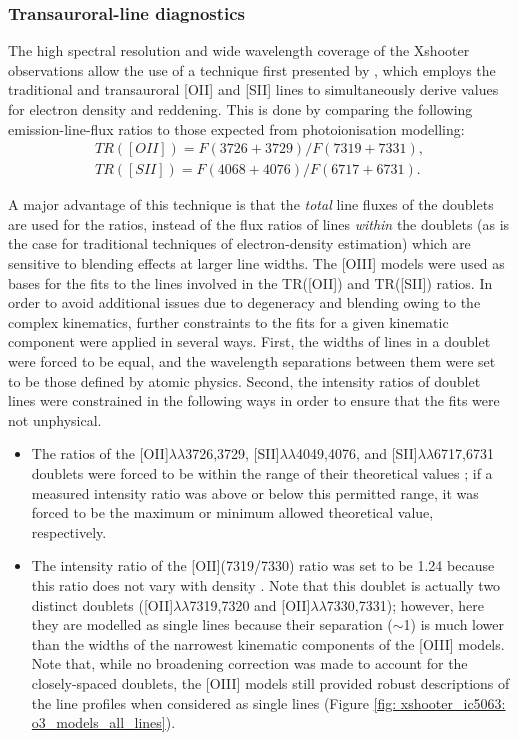 \subsubsection{Transauroral-line diagnostics}
\label{section: xshooter_ic5063: properties_of_outflowing_gas: uvb_vis_analysis_and_results: transauroral_lines}

The high spectral resolution and wide wavelength coverage of the Xshooter observations allow the use of a technique first presented by \citet{Holt2011}, which employs the traditional and transauroral [OII] and [SII] lines to simultaneously derive values for electron density and reddening. This is done by comparing the following emission-line-flux ratios to those expected from photoionisation modelling:
\begin{align*}
TR([OII]) = F(3726 + 3729) / F(7319 + 7331), \\
TR([SII]) = F(4068 + 4076) / F(6717 + 6731).
\end{align*} 

A major advantage of this technique is that the \textit{total} line fluxes of the doublets are used for the ratios, instead of the flux ratios of lines \textit{within} the doublets (as is the case for traditional techniques of electron-density estimation) which are sensitive to blending effects at larger line widths. The [OIII] models were used as bases for the fits to the lines involved in the TR([OII]) and TR([SII]) ratios. In order to avoid additional issues due to degeneracy and blending owing to the complex kinematics, further constraints to the fits for a given kinematic component were applied in several ways. First, the widths of lines in a doublet were forced to be equal, and the wavelength separations between them were set to be those defined by atomic physics. Second, the intensity ratios of doublet lines were constrained in the following ways in order to ensure that the fits were not unphysical.
\begin{itemize}
	\item The ratios of the [OII]$\lambda\lambda$3726,3729, [SII]$\lambda\lambda$4049,4076, and [SII]$\lambda\lambda$6717,6731 doublets were forced to be within the range of their theoretical values \citep{Osterbrock2006, Rose2018}; if a measured intensity ratio was above or below this permitted range, it was forced to be the maximum or minimum allowed theoretical value, respectively.
	\item The intensity ratio of the [OII](7319/7330) ratio was set to be 1.24 because this ratio does not vary with density \citep{Rose2018}. Note that this doublet is actually two distinct doublets ([OII]$\lambda\lambda$7319,7320 and [OII]$\lambda\lambda$7330,7331); however, here they are modelled as single lines because their separation ($\sim$1\;{\AA}) is much lower than the widths of the narrowest kinematic components of the [OIII] models. Note that, while no broadening correction was made to account for the closely-spaced doublets, the [OIII] models still provided robust descriptions of the line profiles when considered as single lines (Figure \ref{fig: xshooter_ic5063: o3_models_all_lines}).
\end{itemize}


